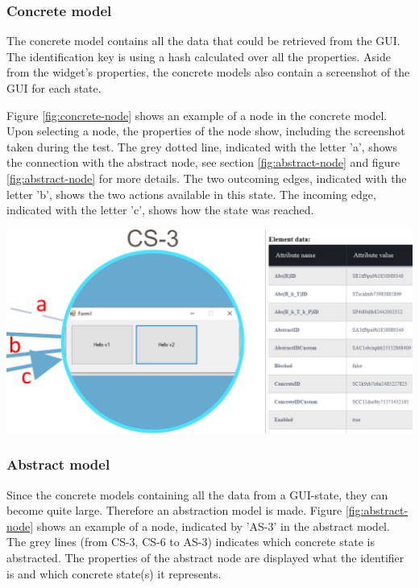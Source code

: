 \subsubsection{Concrete model}
The concrete model contains all the data that could be retrieved from the GUI. The identification key is using a hash calculated over all the properties. Aside from the widget's properties, the concrete models also contain a screenshot of the GUI for each state.

Figure \ref{fig:concrete-node} shows an example of a node in the concrete model. Upon selecting a node, the properties of the node show, including the screenshot taken during the test. The grey dotted line, indicated with the letter 'a', shows the connection with the abstract node, see section \ref{fig:abstract-node} and figure \ref{fig:abstract-node} for more details. The two outcoming edges, indicated with the letter 'b', shows the two actions available in this state. The incoming edge, indicated with the letter 'c', shows how the state was reached. 

\bigskip
\begingroup
\captionsetup{type=figure}
\includegraphics[scale=0.5]{document/pics/concrete-model.png}
\label{fig:concrete-node}
\endgroup

\subsubsection{Abstract model} \label{abstract-node}
Since the concrete models containing all the data from a GUI-state, they can become quite large.  Therefore an abstraction model is made. Figure \ref{fig:abstract-node} shows an example of a node, indicated by 'AS-3'  in the abstract model. The grey lines (from CS-3, CS-6 to AS-3) indicates which concrete state is abstracted. The properties of the abstract node are displayed what the identifier is and which concrete state(s) it represents.

